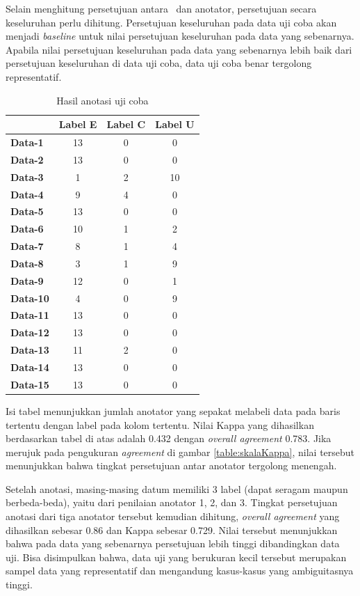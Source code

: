 Selain menghitung persetujuan antara \saya~dan anotator, persetujuan secara keseluruhan perlu dihitung. Persetujuan keseluruhan pada data uji coba akan menjadi \textit{baseline} untuk nilai persetujuan keseluruhan pada data yang sebenarnya. Apabila nilai persetujuan keseluruhan pada data yang sebenarnya lebih baik dari persetujuan keseluruhan di data uji coba, data uji coba benar tergolong representatif.
\begin{table}
	\centering
	\caption{Hasil anotasi uji coba}
	\label{table:data-fleiss}
	\begin{tabular}{|p{2cm}|c|c|c|}
		\hline
		\textbf{} & \textbf{Label E} & \textbf{Label C} & \textbf{Label U} \\ \hline
		\textbf{Data-1} & 13 & 0 & 0 \\ \hline
		\textbf{Data-2} & 13 & 0 & 0 \\ \hline
		\textbf{Data-3} & 1 & 2 & 10 \\ \hline
		\textbf{Data-4} & 9 & 4 & 0 \\ \hline
		\textbf{Data-5} & 13 & 0 & 0 \\ \hline
		\textbf{Data-6} & 10 & 1 & 2 \\ \hline
		\textbf{Data-7} & 8 & 1 & 4 \\ \hline
		\textbf{Data-8} & 3 & 1 & 9 \\ \hline
		\textbf{Data-9} & 12 & 0 & 1 \\ \hline
		\textbf{Data-10} & 4 & 0 & 9 \\ \hline
		\textbf{Data-11} & 13 & 0 & 0 \\ \hline
		\textbf{Data-12} & 13 & 0 & 0 \\ \hline
		\textbf{Data-13} & 11 & 2 & 0 \\ \hline
		\textbf{Data-14} & 13 & 0 & 0 \\ \hline
		\textbf{Data-15} & 13 & 0 & 0 \\ \hline
	\end{tabular}
\end{table}	
\noindent Isi tabel menunjukkan jumlah anotator yang sepakat melabeli data pada baris tertentu dengan label pada kolom tertentu. Nilai Kappa yang dihasilkan berdasarkan tabel di atas adalah 0.432 dengan \textit{overall agreement} 0.783. Jika merujuk pada pengukuran \textit{agreement} di gambar \ref{table:skalaKappa}, nilai tersebut menunjukkan bahwa tingkat persetujuan antar anotator tergolong menengah.  

Setelah anotasi, masing-masing datum memiliki 3 label (dapat seragam maupun berbeda-beda), yaitu dari penilaian anotator 1, 2, dan 3. Tingkat persetujuan anotasi dari tiga anotator tersebut kemudian dihitung, \textit{overall agreement} yang dihasilkan sebesar 0.86 dan Kappa sebesar 0.729. Nilai tersebut menunjukkan bahwa pada data yang sebenarnya persetujuan lebih tinggi dibandingkan data uji. Bisa disimpulkan bahwa, data uji yang berukuran kecil tersebut merupakan sampel data yang representatif dan mengandung kasus-kasus yang ambiguitasnya tinggi.

